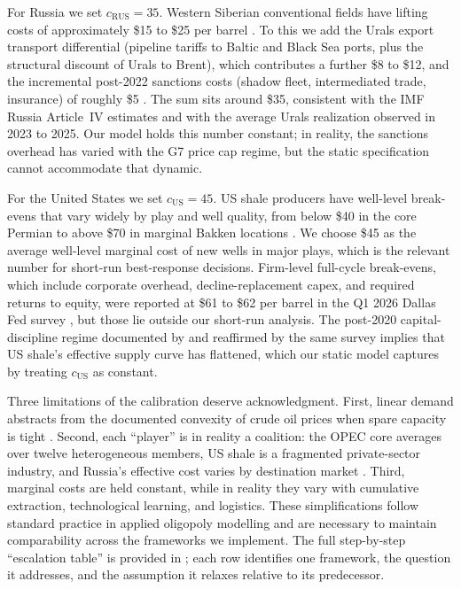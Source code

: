 For Russia we set $c_{\text{RUS}} = 35$. Western Siberian conventional
fields have lifting costs of approximately \$15 to \$25 per barrel
\citep[p.~??]{henderson2015,henderson2011}\citep{imf2021}. To this we add the Urals export transport
differential (pipeline tariffs to Baltic and Black Sea ports, plus the
structural discount of Urals to Brent), which contributes a further
\$8 to \$12, and the incremental post-2022 sanctions costs (shadow
fleet, intermediated trade, insurance) of roughly \$5
\citep{simolasolanko2017,eia2025}. The sum sits around \$35, consistent
with the IMF Russia Article~IV estimates \citep{imf2021} and with the
average Urals realization observed in 2023 to 2025. Our model holds this number
constant; in reality, the sanctions overhead has varied with the G7
price cap regime, but the static specification cannot accommodate that
dynamic.

For the United States we set $c_{\text{US}} = 45$. US shale producers
have well-level break-evens that vary widely by play and well quality,
from below \$40 in the core Permian to above \$70 in marginal Bakken
locations \citep{dallasfed2026,smith2016}. We choose \$45 as the average
well-level marginal cost of new wells in major plays, which is the
relevant number for short-run best-response decisions. Firm-level
full-cycle break-evens, which include corporate overhead,
decline-replacement capex, and required returns to equity, were reported
at \$61 to \$62 per barrel in the Q1 2026 Dallas Fed survey
\citep{dallasfed2026}, but those lie outside our short-run analysis. The
post-2020 capital-discipline regime documented by \citet{kraneagerton2015}
and reaffirmed by the same survey implies that US shale's effective supply curve has
flattened, which our static model captures by treating $c_{\text{US}}$
as constant.

Three limitations of the calibration deserve acknowledgment. First,
linear demand abstracts from the documented convexity of crude oil
prices when spare capacity is tight \citep{till2016}. Second, each
``player'' is in reality a coalition: the OPEC core averages over twelve
heterogeneous members, US shale is a fragmented private-sector industry,
and Russia's effective cost varies by destination market
\citep[p.~??]{henderson2015}\citep{eia2025}. Third, marginal costs are held constant,
while in reality they vary with cumulative extraction, technological
learning, and logistics. These simplifications follow standard practice
in applied oligopoly modelling
\citep{salant1976,huppmannholz2012,alcelay2017} and are necessary to
maintain comparability across the frameworks we implement. The full
step-by-step ``escalation table'' is provided in ; each row
identifies one framework, the question it addresses, and the assumption
it relaxes relative to its predecessor.

